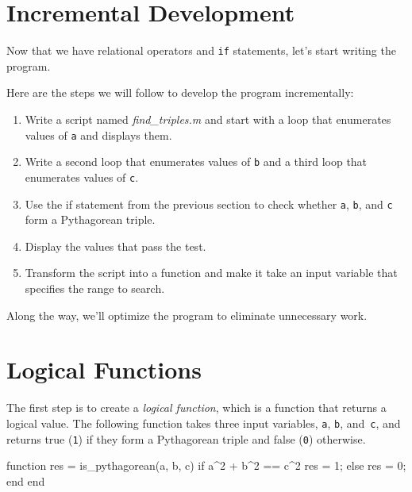 \section{Incremental Development}
\label{increxample}

Now that we have relational operators and \lstinline{if} statements, let's start writing
the program.

Here are the steps we will follow to develop the program incrementally:

\begin{enumerate}

\item Write a script named \emph{find_triples.m} and start with a loop that enumerates values of \lstinline{a} and displays them.

\item Write a second loop that enumerates values of \lstinline{b} and a third loop that enumerates values of \lstinline{c}.

\item Use the if statement from the previous section to check whether \lstinline{a}, \lstinline{b}, and \lstinline{c} form a Pythagorean triple.

\item Display the values that pass the test.

\item Transform the script into a function and make it take an input variable that specifies the range to search.

\end{enumerate}

Along the way, we'll optimize the program to eliminate unnecessary work.


\section{Logical Functions}

The first step is to create a \emph{logical function}, which is a function that returns a logical value.
The following function takes three input variables, \lstinline{a}, \lstinline{b}, and~\lstinline{c}, and returns true (\lstinline{1}) if they form a Pythagorean triple and false (\lstinline{0}) otherwise.

\begin{code}
function res = is_pythagorean(a, b, c)
    if a^2 + b^2 == c^2
        res = 1;
    else
        res = 0;
    end
end
\end{code}

